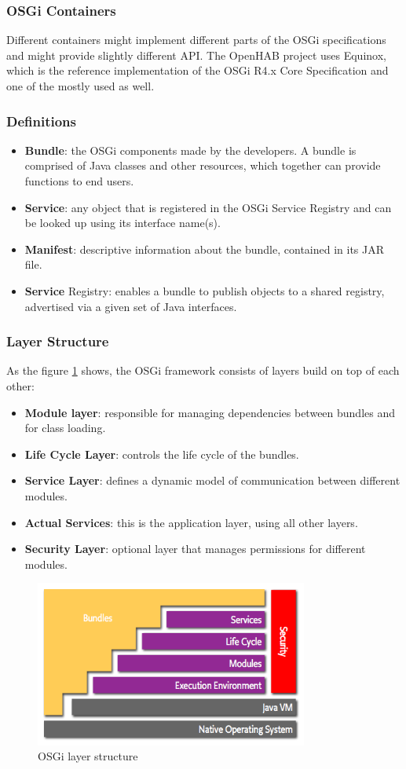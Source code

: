 \subsubsection{OSGi Containers}
Different containers might implement different parts of the OSGi specifications and might provide slightly different API. The OpenHAB 
project uses Equinox, which is the reference implementation of the OSGi R4.x Core Specification and one of the mostly used as well.

\subsubsection{Definitions}
\begin{itemize}
	\item \textbf{Bundle}: the OSGi components made by the developers. A bundle is comprised of Java classes and other resources, 
	which together can provide functions to end users.
	\item \textbf{Service}: any object that is registered in the OSGi Service Registry and can be looked up using its interface name(s).
	\item \textbf{Manifest}: descriptive information about the bundle, contained in its JAR file.
	\item \textbf{Service} Registry: enables a bundle to publish objects to a shared registry, advertised via a given set of Java interfaces.
\end{itemize}

\subsubsection{Layer Structure}
As the figure \ref{fig:osgi-layering} shows, the OSGi framework consists of layers build on top of each other:

\begin{itemize}
	\item \textbf{Module layer}: responsible for managing dependencies between bundles and for class loading.
	\item \textbf{Life Cycle Layer}: controls the life cycle of the bundles.
	\item \textbf{Service Layer}: defines a dynamic model of communication between different modules.
	\item \textbf{Actual Services}: this is the application layer, using all other layers.
	\item \textbf{Security Layer}: optional layer that manages permissions for different modules.
\end{itemize}

\begin{figure}
	\centering
	\includegraphics[width=0.8\textwidth]{images/Chapter_05/osgi-layering.png}
	\caption{OSGi layer structure}
	\label{fig:osgi-layering}
\end{figure}
